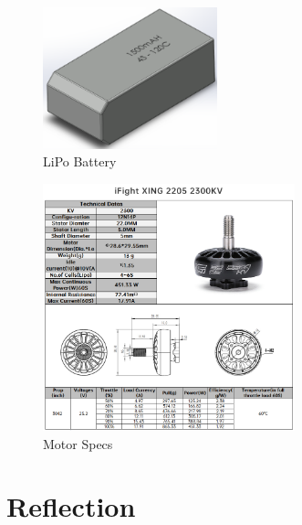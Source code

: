 \documentclass[12pt, titlepage]{article}
\begin{document}
\begin{figure}[h!]
  \begin{center} 
  \caption{LiPo Battery}
  \label{LiPo Battery}
        \includegraphics[width=0.45\textwidth]{CAD_Lipo.png}
  \end{center}
\end{figure}

\begin{figure}[h!]
  \begin{center} 
  \caption{Motor Specs}
  \label{motorSpecs}
        \includegraphics[width=0.65\textwidth]{iflightSpecs.png}
  \end{center}
\end{figure}

\clearpage

\section{Reflection}
\label{sec:Reflection}
\end{document}

